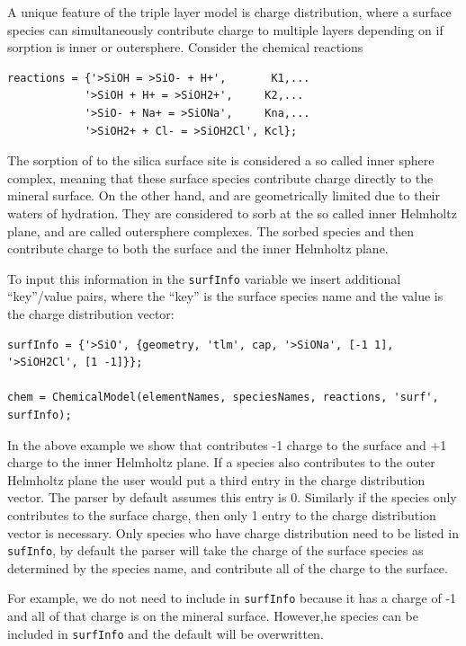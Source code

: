 \documentclass{article}
\begin{document}
A unique feature of the triple layer model is charge distribution, where a surface species can simultaneously contribute charge to multiple layers depending on if sorption is inner or outersphere. Consider the chemical reactions

\begin{lstlisting}
reactions = {'>SiOH = >SiO- + H+',       K1,...
            '>SiOH + H+ = >SiOH2+',     K2,...
            '>SiO- + Na+ = >SiONa',     Kna,...
            '>SiOH2+ + Cl- = >SiOH2Cl', Kcl};
\end{lstlisting}
The sorption of  to the silica surface site is considered a so called inner sphere complex, meaning that these surface species contribute charge directly to the mineral surface. On the other hand,  and  are geometrically limited due to their waters of hydration. They are considered to sorb at the so called inner Helmholtz plane, and are called outersphere complexes. The sorbed species  and  then contribute charge to both the surface and the inner Helmholtz plane.

To input this information in the \verb|surfInfo| variable we insert additional ``key''/value pairs, where the ``key'' is the surface species name and the value is the charge distribution vector:

\begin{lstlisting}
surfInfo = {'>SiO', {geometry, 'tlm', cap, '>SiONa', [-1 1], '>SiOH2Cl', [1 -1]}};

chem = ChemicalModel(elementNames, speciesNames, reactions, 'surf', surfInfo);
\end{lstlisting}
In the above example we show that  contributes -1 charge to the surface and +1 charge to the inner Helmholtz plane. If a species also contributes to the outer Helmholtz plane the user would put a third entry in the charge distribution vector. The parser by default assumes this entry is 0. Similarly if the species only contributes to the surface charge, then only 1 entry to the charge distribution vector is necessary. Only species who have charge distribution need to be listed in \verb|sufInfo|, by default the parser will take the charge of the surface species as determined by the species name,  and contribute all of the charge to the surface. 

For example, we do not need to include  in \verb|surfInfo| because it has a charge of -1 and all of that charge is on the mineral surface. However,he species can be included in \verb|surfInfo| and the default will be overwritten.
\end{document}
